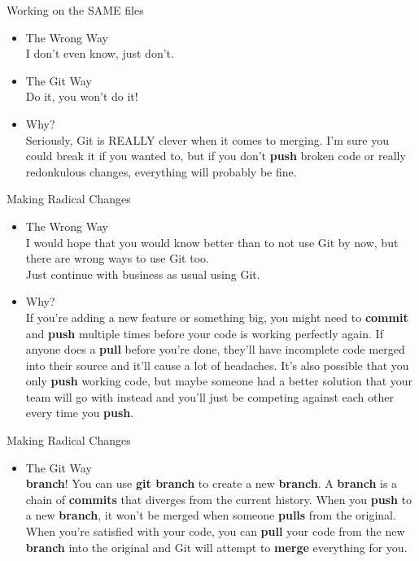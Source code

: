 \documentclass{beamer}
\begin{document}
\begin{frame}{Working on the SAME files}
\begin{itemize}
\item The Wrong Way\\
        I don't even know, just don't.
\pause
\item The Git Way\\
        Do it, you won't do it!
\pause
  \item Why?\\
        Seriously, Git is REALLY clever when it comes to merging. I'm sure you could break it if you wanted to, but if you don't \textbf{push} broken code or really redonkulous changes, everything will probably be fine.
\end{itemize}
\end{frame}

\begin{frame}{Making Radical Changes}
  \begin{itemize}
    \item The Wrong Way\\
            I would hope that you would know better than to not use Git by now, but there are wrong ways to use Git too.\\
            Just continue with business as usual using Git.
    \pause
    \item Why?\\
            If you're adding a new feature or something big, you might need to \textbf{commit} and \textbf{push} multiple times before your code is working perfectly again. If anyone does a \textbf{pull} before you're done, they'll have incomplete code merged into their source and it'll cause a lot of headaches. It's also possible that you only \textbf{push} working code, but maybe someone had a better solution that your team will go with instead and you'll just be competing against each other every time you \textbf{push}.
          \end{itemize}
          \end{frame}
\begin{frame}{Making Radical Changes}
  \begin{itemize}
    \item The Git Way\\
            \textbf{branch}! You can use \textbf{git branch} to create a new \textbf{branch}. A \textbf{branch} is a chain of \textbf{commits} that diverges from the current history. When you \textbf{push} to a new \textbf{branch}, it won't be merged when someone \textbf{pulls} from the original. When you're satisfied with your code, you can \textbf{pull} your code from the new \textbf{branch} into the original and Git will attempt to \textbf{merge} everything for you.
  \end{itemize}
\end{frame}
\end{document}
